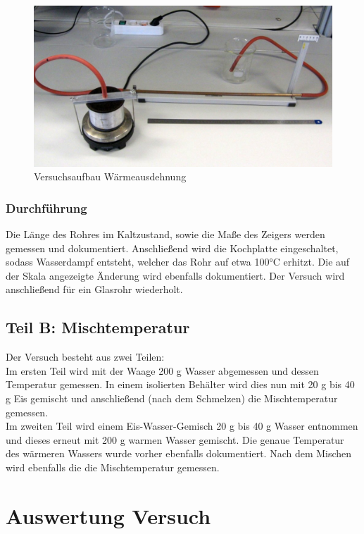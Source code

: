 \documentclass[a4paper]{scrartcl}
\numberwithin{equation}{subsection}
\begin{document}
\begin{figure}[H]
\includegraphics[width=12cm]{Abbildungen/aufbau_warmeausdehnung2}
\centering
\caption{Versuchsaufbau Wärmeausdehnung \cite{anl}}
\centering
\label{fig:bindungsenergie}
\end{figure}

\subsubsection{Durchführung}
Die Länge des Rohres im Kaltzustand, sowie die Maße des Zeigers werden gemessen und dokumentiert.
Anschließend wird die Kochplatte eingeschaltet, sodass Wasserdampf entsteht, welcher das Rohr auf etwa 100°C erhitzt.
Die auf der Skala angezeigte Änderung wird ebenfalls dokumentiert.
Der Versuch wird anschließend für ein Glasrohr wiederholt.

\subsection{Teil B: Mischtemperatur}
Der Versuch besteht aus zwei Teilen: \\

Im ersten Teil wird mit der Waage 200 g Wasser abgemessen und dessen Temperatur gemessen. In einem isolierten Behälter wird dies nun mit 20 g bis 40 g Eis gemischt und anschließend (nach dem Schmelzen) die Mischtemperatur gemessen. \\

Im zweiten Teil wird einem Eis-Wasser-Gemisch 20 g bis 40 g Wasser entnommen und dieses erneut mit 200 g warmen Wasser gemischt. Die genaue Temperatur des wärmeren Wassers wurde vorher ebenfalls dokumentiert. Nach dem Mischen wird ebenfalls die die Mischtemperatur gemessen.\\

\newpage
\section{Auswertung Versuch}
\end{document}
